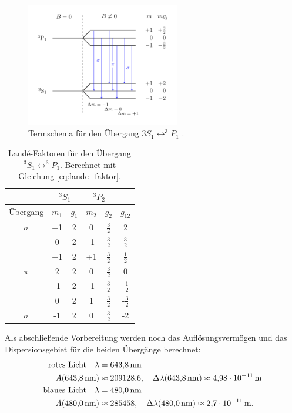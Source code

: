 \FloatBarrier
\begin{figure}[h]
  \centering
  \includegraphics[width=0.6\textwidth]{pics/termschema_blau.pdf}
  \caption{Termschema für den Übergang $3S_1\leftrightarrow ^3\!\!P_1$ \cite{luckyjosh}.}
  \label{fig: termschema_blau}
\end{figure}
\FloatBarrier

\FloatBarrier
\begin{table}

  \caption{Landé-Faktoren für den Übergang $^3S_1\leftrightarrow ^3\!\!P_1$. Berechnet mit Gleichung \eqref{eq:lande_faktor}.} %
	\label{tab:Lande_blau}
	\centering
  \renewcommand{\arraystretch}{1.2}
  \begin{tabular}{cccccc}
		\toprule
    & \multicolumn{2}{c}{${}^3S_1$}  & \multicolumn{2}{c}{${}^3P_2$} \\
		\midrule
    Übergang & $m_1$  & $g_{1}$ & $m_2$ & $ g_2$ & $g_{12}$\\
		\midrule
		$\sigma$ & +1 & 2 & 0 & $\frac{3}{2}$& 2\\
		& 0 & 2 & -1 & $\frac{3}{2}$ & $\frac{3}{2}$\\
		\midrule
		& +1 & 2 & +1 & $\frac{3}{2}$ & $\frac{1}{2}$\\
		$\pi$ & 2 & 2 & 0 & $\frac{3}{2}$ & 0 \\
		& -1 & 2 & -1 & $\frac{3}{2}$ & -$\frac{1}{2}$\\
		\midrule
		& 0 & 2 & 1 & $\frac{3}{2}$ & -$\frac{3}{2}$\\
		$\sigma$ & -1 & 2 & 0 & $\frac{3}{2}$& -2\\
		\bottomrule
	\end{tabular}
\end{table}
\FloatBarrier

Als abschließende Vorbereitung werden noch das Auflösungsvermögen und das Dispersionsgebiet
für die beiden Übergänge berechnet:
\begin{align}
\text{rotes Licht}\quad  \lambda&=\SI{643.8}{\nano\meter} \notag\\
   A(\SI{643.8}{\nano\meter})&\approx 209128.6, \quad \Delta \lambda(\SI{643.8}{\nano\meter})\approx\SI{4.98e-11}{\meter} \label{eq: auf_dis_rot} \\
\text{blaues Licht}  \quad \lambda&=\SI{480.0}{\nano\meter}\notag \\
 A(\SI{480.0}{\nano\meter})&\approx 285458, \quad \Delta \lambda(\SI{480.0}{\nano\meter})\approx \SI{2.7e-11}{\meter} \label{eq: auf_dis_blau}.
\end{align}


